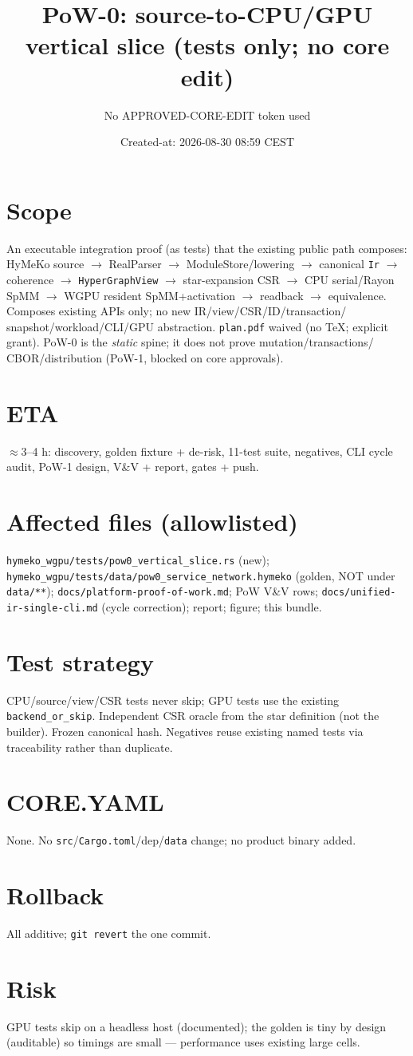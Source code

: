 \documentclass[11pt]{article}
\title{PoW-0: source-to-CPU/GPU vertical slice (tests only; no core edit)}
\author{No APPROVED-CORE-EDIT token used}
\date{Created-at: 2026-08-30 08:59 CEST}
\begin{document}
\maketitle
\section*{Scope}
An executable integration proof (as tests) that the existing public path composes:
HyMeKo source $\to$ RealParser $\to$ ModuleStore/lowering $\to$ canonical \texttt{Ir}
$\to$ coherence $\to$ \texttt{HyperGraphView} $\to$ star-expansion CSR $\to$ CPU
serial/Rayon SpMM $\to$ WGPU resident SpMM+activation $\to$ readback $\to$
equivalence. Composes existing APIs only; no new IR/view/CSR/ID/transaction/
snapshot/workload/CLI/GPU abstraction. \texttt{plan.pdf} waived (no TeX; explicit
grant). PoW-0 is the \emph{static} spine; it does not prove mutation/transactions/
CBOR/distribution (PoW-1, blocked on core approvals).
\section{ETA} $\approx$3--4 h: discovery, golden fixture + de-risk, 11-test suite,
negatives, CLI cycle audit, PoW-1 design, V\&V + report, gates + push.
\section{Affected files (allowlisted)}
\texttt{hymeko\_wgpu/tests/pow0\_vertical\_slice.rs} (new);
\texttt{hymeko\_wgpu/tests/data/pow0\_service\_network.hymeko} (golden, NOT under
\texttt{data/**}); \texttt{docs/platform-proof-of-work.md}; PoW V\&V rows;
\texttt{docs/unified-ir-single-cli.md} (cycle correction); report; figure; this bundle.
\section{Test strategy} CPU/source/view/CSR tests never skip; GPU tests use the
existing \texttt{backend\_or\_skip}. Independent CSR oracle from the star
definition (not the builder). Frozen canonical hash. Negatives reuse existing
named tests via traceability rather than duplicate.
\section{CORE.YAML} None. No \texttt{src}/\texttt{Cargo.toml}/dep/\texttt{data}
change; no product binary added.
\section{Rollback} All additive; \texttt{git revert} the one commit.
\section{Risk} GPU tests skip on a headless host (documented); the golden is tiny
by design (auditable) so timings are small --- performance uses existing large cells.
\end{document}
